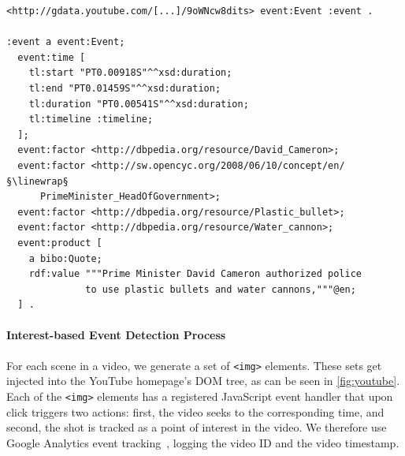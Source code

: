 \documentclass[runningheads,a4paper]{llncs}
\newcommand{\linewrap}{\raisebox{-.6ex}{\textcolor{grey}{$\hookleftarrow$}}}
\begin{document}
\begin{lstlisting}[caption=Exemplary extracted named entities from a YouTube video on the London riots., label=code:semwebvid, float=h, escapechar=§, belowskip=-2em]
<http://gdata.youtube.com/[...]/9oWNcw8dits> event:Event :event .

:event a event:Event;
  event:time [
    tl:start "PT0.00918S"^^xsd:duration;
    tl:end "PT0.01459S"^^xsd:duration;
    tl:duration "PT0.00541S"^^xsd:duration;
    tl:timeline :timeline;
  ];
  event:factor <http://dbpedia.org/resource/David_Cameron>;
  event:factor <http://sw.opencyc.org/2008/06/10/concept/en/§\linewrap§
      PrimeMinister_HeadOfGovernment>;
  event:factor <http://dbpedia.org/resource/Plastic_bullet>;
  event:factor <http://dbpedia.org/resource/Water_cannon>;
  event:product [
    a bibo:Quote;
    rdf:value """Prime Minister David Cameron authorized police
              to use plastic bullets and water cannons,"""@en;
  ] .
\end{lstlisting} 

\paragraph{Interest-based Event Detection Process}
For each scene in a video, we generate a set of \texttt{<img>} elements. These sets get injected into the YouTube homepage's DOM tree, as can be seen in \autoref{fig:youtube}. Each of the \texttt{<img>} elements has a registered JavaScript event handler that upon click triggers two actions: first, the video seeks to the corresponding time, and second, the shot is tracked as a point of interest in the video. We therefore use Google Analytics event tracking~\cite{analyticsevent}, logging the video ID and the video timestamp.
\end{document}
